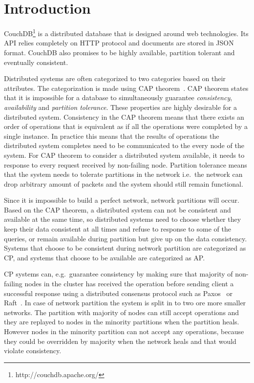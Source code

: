 \section{Introduction}

CouchDB\footnote{http://couchdb.apache.org/} is a distributed database that is
designed around web technologies. Its API relies completely on HTTP protocol and
documents are stored in JSON format. CouchDB also promises to be highly
available, partition tolerant and eventually consistent.

Distributed systems are often categorized to two categories based on their
attributes. The categorization is made using CAP
theorem~\cite{gilbert2002brewer}. CAP theorem states that it is impossible for a
database to simultaneously guarantee \emph{consistency}, \emph{availability}
and \emph{partition tolerance}. These properties are highly desirable for a
distributed system.  Consistency in the CAP theorem means that there exists an
order of operations that is equivalent as if all the operations were completed
by a single instance. In practice this means that the results of operations the
distributed system completes need to be communicated to the every node of the
system. For CAP theorem to consider a distributed system available, it needs to
response to every request received by non-failing node. Partition tolerance
means that the system needs to tolerate partitions in the network i.e.\ the
network can drop arbitrary amount of packets and the system should still
remain functional.

Since it is impossible to build a perfect network, network partitions will occur.
Based on the CAP theorem, a distributed system can not be consistent and
available at the same time, so distributed systems need to choose whether they
keep their data consistent at all times and refuse to response to some of the
queries, or remain available during partition but give up on the data
consistency. Systems that choose to be consistent during network partition are
categorized as CP, and systems that choose to be available are categorized as
AP.\

CP systems can, e.g.\ guarantee consistency by making sure that majority of
non-failing nodes in the cluster has received the operation before sending
client a successful response using a distributed consensus protocol such as
Paxos~\cite{lamport1998part} or Raft~\cite{ongaro2014search}. In case of
network partition the system is split in to two ore more smaller networks. The
partition with majority of nodes can still accept operations and they are
replayed to nodes in the minority partitions when the partition heals. However
nodes in the minority partition can not accept any operations, because they
could be overridden by majority when the network heals and that would violate
consistency.

